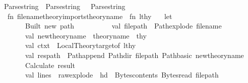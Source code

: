 \begin{isabellebody}
\ \ \ \ {\isacharparenleft}{\kern0pt}{\isacharparenleft}{\kern0pt}{\isacharparenleft}{\kern0pt}Parse{\isachardot}{\kern0pt}string\ {\isacharminus}{\kern0pt}{\isacharminus}{\kern0pt}\ Parse{\isachardot}{\kern0pt}string{\isacharparenright}{\kern0pt}\ \ {\isacharminus}{\kern0pt}{\isacharminus}{\kern0pt}\ Parse{\isachardot}{\kern0pt}string{\isacharparenright}{\kern0pt}\isanewline
\ \ \ \ {\isachargreater}{\kern0pt}{\isachargreater}{\kern0pt}\ {\isacharparenleft}{\kern0pt}fn\ {\isacharparenleft}{\kern0pt}{\isacharparenleft}{\kern0pt}file{\isacharunderscore}{\kern0pt}name{\isacharcomma}{\kern0pt}theory{\isacharunderscore}{\kern0pt}imports{\isacharparenright}{\kern0pt}{\isacharcomma}{\kern0pt}theory{\isacharunderscore}{\kern0pt}name{\isacharparenright}{\kern0pt}\ {\isacharequal}{\kern0pt}{\isachargreater}{\kern0pt}\ fn\ lthy\ {\isacharequal}{\kern0pt}{\isachargreater}{\kern0pt}\isanewline
\ \ let\isanewline
\ \ \ \ \ \ \ \ \ \ {\isacharparenleft}{\kern0pt}{\isacharasterisk}{\kern0pt}Built\ new\ path{\isacharasterisk}{\kern0pt}{\isacharparenright}{\kern0pt}\isanewline
\ \ \ \ \ \ \ \ \ \ val\ file{\isacharunderscore}{\kern0pt}path\ {\isacharequal}{\kern0pt}\ Path{\isachardot}{\kern0pt}explode\ file{\isacharunderscore}{\kern0pt}name\isanewline
\ \ \ \ \ \ \ \ \ \ val\ new{\isacharunderscore}{\kern0pt}theory{\isacharunderscore}{\kern0pt}name\ {\isacharequal}{\kern0pt}\ theory{\isacharunderscore}{\kern0pt}name\ {\isacharcircum}{\kern0pt}\ {\isachardoublequote}{\kern0pt}{\isachardot}{\kern0pt}thy{\isachardoublequote}{\kern0pt}\isanewline
\ \ \ \ \ \ \ \ \ \ val\ ctxt\ {\isacharequal}{\kern0pt}\ Local{\isacharunderscore}{\kern0pt}Theory{\isachardot}{\kern0pt}target{\isacharunderscore}{\kern0pt}of\ lthy\isanewline
\ \ \ \ \ \ \ \ \ \ val\ res{\isacharunderscore}{\kern0pt}path\ {\isacharequal}{\kern0pt}\ Path{\isachardot}{\kern0pt}append\ {\isacharparenleft}{\kern0pt}Path{\isachardot}{\kern0pt}dir\ file{\isacharunderscore}{\kern0pt}path{\isacharparenright}{\kern0pt}\ {\isacharparenleft}{\kern0pt}Path{\isachardot}{\kern0pt}basic\ new{\isacharunderscore}{\kern0pt}theory{\isacharunderscore}{\kern0pt}name{\isacharparenright}{\kern0pt}\isanewline
\isanewline
\ \ \ \ \ \ \ \ \ \ {\isacharparenleft}{\kern0pt}{\isacharasterisk}{\kern0pt}Calculate\ result{\isacharasterisk}{\kern0pt}{\isacharparenright}{\kern0pt}\isanewline
\ \ \ \ \ \ \ \ \ \ {\isacharparenleft}{\kern0pt}{\isacharasterisk}{\kern0pt}val\ lines\ {\isacharequal}{\kern0pt}\ raw{\isacharunderscore}{\kern0pt}explode\ {\isacharparenleft}{\kern0pt}\ hd\ \ {\isacharparenleft}{\kern0pt}Bytes{\isachardot}{\kern0pt}contents\ {\isacharparenleft}{\kern0pt}Bytes{\isachardot}{\kern0pt}read\ file{\isacharunderscore}{\kern0pt}path{\isacharparenright}{\kern0pt}{\isacharparenright}{\kern0pt}{\isacharparenright}{\kern0pt}\ {\isacharsemicolon}{\kern0pt}{\isacharasterisk}{\kern0pt}{\isacharparenright}{\kern0pt}\isanewline

\end{isabellebody}

